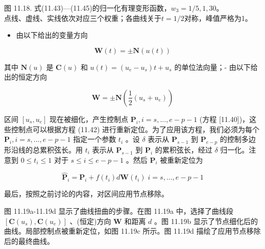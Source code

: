 \documentclass[../main.tex]{subfiles}
\begin{document}
\begin{center}
\begin{minipage}{26cm}
\centering
{}
\par\smallskip
图 11.18. 式(11.43)—(11.45)的归一化有理变形函数，$w_3=1/5,1,30$。\\
点线、虚线、实线依次对应三个权重；各曲线关于$t=1/2$对称，峰值严格为1。
\end{minipage}
\end{center}

\begin{itemize}
\item 由以下给出的变量方向
\end{itemize}

\[
\mathbf{W}\left( t\right)  =  \pm  \mathbf{N}\left( {u\left( t\right) }\right)  \tag{11.46}
\]

其中 \(\mathbf{N}\left( u\right)\) 是 \(\mathbf{C}\left( u\right)\) 和 \(u\left( t\right)  = \left( {{u}_{e} - {u}_{s}}\right) t + {u}_{s}\) 的单位法向量；- 由以下给出的恒定方向

\[
\mathbf{W} =  \pm  \mathbf{N}\left( {\frac{1}{2}\left( {{u}_{s} + {u}_{e}}\right) }\right)  \tag{11.47}
\]

区间 \(\left\lbrack  {{u}_{s},{u}_{e}}\right\rbrack\) 现在被细化，产生控制点 \({\mathbf{P}}_{i},i = s,\ldots ,e - p - 1\) (方程 [11.40])，这些控制点可以根据方程 (11.42) 进行重新定位。为了应用该方程，我们必须为每个 \({\mathbf{P}}_{i},i = s,\ldots ,e - p - 1\) 指定一个参数 \({t}_{i}\) 。设 \(\delta\) 表示从 \({\mathbf{P}}_{s - 1}\) 到 \({\mathbf{P}}_{e - p}\) 的控制多边形沿线的总累积弦长。用 \({t}_{i}\) 表示从 \({\mathbf{P}}_{s - 1}\) 到 \({\mathbf{P}}_{i}\) 的累积弦长，经过 \(\delta\) 归一化。注意到 \(0 \leq  {t}_{i} \leq  1\) 对于 \(s \leq  i \leq  e - p - 1\) 。然后 \({\mathbf{P}}_{i}\) 被重新定位为

\[
{\widehat{\mathbf{P}}}_{i} = {\mathbf{P}}_{i} + f\left( {t}_{i}\right) d\mathbf{W}\left( {t}_{i}\right) \;i = s,\ldots ,e - p - 1 \tag{11.48}
\]

最后，按照之前讨论的内容，对区间应用节点移除。

图 11.19a-11.19d 显示了曲线扭曲的步骤。在图 11.19a 中，选择了曲线段 \(\left\lbrack  {\mathbf{C}\left( {u}_{s}\right) ,\mathbf{C}\left( {u}_{e}\right) }\right\rbrack\) 、(恒定)方向 \(\mathbf{W}\) 和距离 \(d\) 。图 11.19b 显示了节点细化后的曲线。局部控制点被重新定位，如图 11.19c 所示。图 11.19d 描绘了应用节点移除后的最终曲线。
\end{document}
